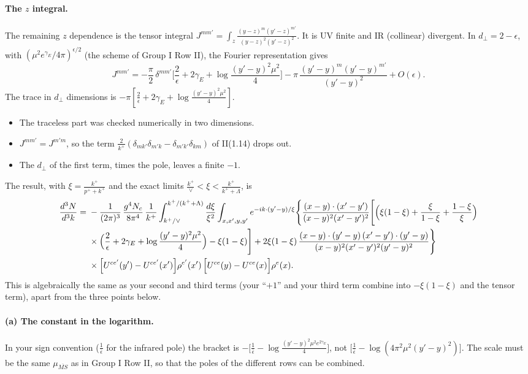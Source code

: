 \documentclass[10pt]{article}
\numberwithin{equation}{section}
\begin{document}
\paragraph{The $z$ integral.} The remaining $z$ dependence is the tensor integral $J^{mm'}=\int_z\frac{(y-z)^m(y'-z)^{m'}}{(y-z)^2(y'-z)^2}$. It is UV finite and IR (collinear) divergent. In $d_\perp=2-\epsilon$, with $(\mu^2e^{\gamma_E}/4\pi)^{\epsilon/2}$ (the scheme of Group I Row II), the Fourier representation gives
\begin{equation}
J^{mm'}=-\frac{\pi}{2}\,\delta^{mm'}\Big[\frac{2}{\epsilon}+2\gamma_E+\log\frac{(y'-y)^2\mu^2}{4}\Big]-\pi\,\frac{(y'-y)^m(y'-y)^{m'}}{(y'-y)^2}+O(\epsilon).
\end{equation}
The trace in $d_\perp$ dimensions is $-\pi[\frac2\epsilon+2\gamma_E+\log\frac{(y'-y)^2\mu^2}{4}]$.
\begin{itemize}
\item The traceless part was checked numerically in two dimensions.
\item $J^{mm'}=J^{m'm}$, so the term $\frac{2}{k^+}(\delta_{mk'}\delta_{m'k}-\delta_{m'k'}\delta_{km})$ of II(1.14) drops out.
\item The $d_\perp$ of the first term, times the pole, leaves a finite $-1$.
\end{itemize}
The result, with $\xi=\frac{k^+}{p^++k^+}$ and the exact limits $\frac{k^+}{\vee}<\xi<\frac{k^+}{k^++\Lambda}$, is
\begin{align}
\frac{d^{3}N}{d^{3}k} ={}& -\frac{1}{(2\pi)^{3}}\,\frac{g^{4}N_{c}}{8\pi^{4}}\,\frac{1}{k^{+}}\int_{k^{+}/\vee}^{k^{+}/(k^{+}+\Lambda)}\frac{d\xi}{\xi^{2}}\int_{x,x',y,y'}e^{-ik\cdot(y'-y)/\xi}\Bigg\{\frac{(x-y)\cdot(x'-y')}{(x-y)^{2}(x'-y')^{2}}\Bigg[\Big(\xi(1-\xi)+\frac{\xi}{1-\xi}+\frac{1-\xi}{\xi}\Big)\notag\\
&\times\Big(\frac{2}{\epsilon}+2\gamma_{E}+\log\frac{(y'-y)^{2}\mu^{2}}{4}\Big)-\xi(1-\xi)\Bigg]+2\xi(1-\xi)\,\frac{(x-y)\cdot(y'-y)\,(x'-y')\cdot(y'-y)}{(x-y)^{2}(x'-y')^{2}(y'-y)^{2}}\Bigg\}\notag\\
&\times\Big[U^{ce'}(y')-U^{ce'}(x')\Big]\rho^{e'}(x')\,\Big[U^{ce}(y)-U^{ce}(x)\Big]\rho^{e}(x).
\end{align}
This is algebraically the same as your second and third terms (your ``$+1$'' and your third term combine into $-\xi(1-\xi)$ and the tensor term), apart from the three points below.

\paragraph{(a) The constant in the logarithm.} In your sign convention ($\frac{1}{\bar\epsilon}$ for the infrared pole) the bracket is $-\big[\frac1{\bar\epsilon}-\log\frac{(y'-y)^2\mu^2e^{2\gamma_E}}{4}\big]$, not $\big[\frac1{\bar\epsilon}-\log(4\pi^2\mu^2(y'-y)^2)\big]$. The scale must be the same $\mu_{\overline{MS}}$ as in Group I Row II, so that the poles of the different rows can be combined.
\end{document}
